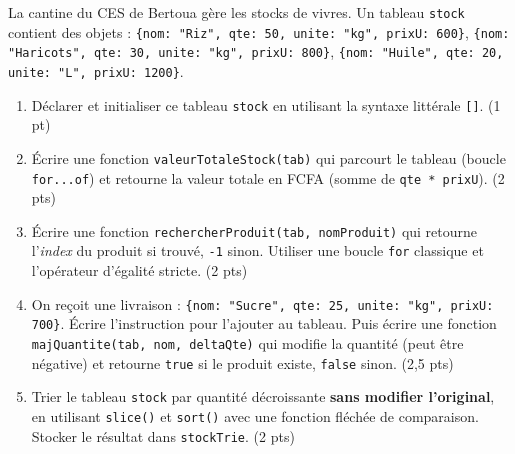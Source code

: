 \documentclass[11pt]{article}
\begin{document}
\begin{exercice}
La cantine du CES de Bertoua gère les stocks de vivres. Un tableau \texttt{stock} contient des objets : \texttt{\{nom: "Riz", qte: 50, unite: "kg", prixU: 600\}}, \texttt{\{nom: "Haricots", qte: 30, unite: "kg", prixU: 800\}}, \texttt{\{nom: "Huile", qte: 20, unite: "L", prixU: 1200\}}.
\begin{enumerate}
    \item Déclarer et initialiser ce tableau \texttt{stock} en utilisant la syntaxe littérale \texttt{[]}. (1 pt)
    \item Écrire une fonction \texttt{valeurTotaleStock(tab)} qui parcourt le tableau (boucle \texttt{for...of}) et retourne la valeur totale en FCFA (somme de \texttt{qte * prixU}). (2 pts)
    \item Écrire une fonction \texttt{rechercherProduit(tab, nomProduit)} qui retourne l'\emph{index} du produit si trouvé, \texttt{-1} sinon. Utiliser une boucle \texttt{for} classique et l'opérateur d'égalité stricte. (2 pts)
    \item On reçoit une livraison : \texttt{\{nom: "Sucre", qte: 25, unite: "kg", prixU: 700\}}. Écrire l'instruction pour l'ajouter au tableau. Puis écrire une fonction \texttt{majQuantite(tab, nom, deltaQte)} qui modifie la quantité (peut être négative) et retourne \texttt{true} si le produit existe, \texttt{false} sinon. (2,5 pts)
    \item Trier le tableau \texttt{stock} par quantité décroissante \textbf{sans modifier l'original}, en utilisant \texttt{slice()} et \texttt{sort()} avec une fonction fléchée de comparaison. Stocker le résultat dans \texttt{stockTrie}. (2 pts)
\end{enumerate}
\end{exercice}
\end{document}
